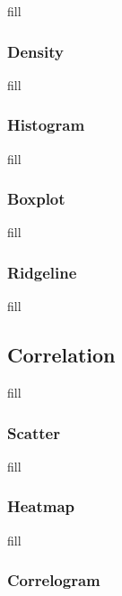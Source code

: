 \documentclass[
  b5paper]{book}
\begin{document}
fill

\hypertarget{density}{%
\subsubsection*{Density}\label{density}}

fill

\hypertarget{histogram}{%
\subsubsection*{Histogram}\label{histogram}}

fill

\hypertarget{boxplot}{%
\subsubsection*{Boxplot}\label{boxplot}}

fill

\hypertarget{ridgeline}{%
\subsubsection*{Ridgeline}\label{ridgeline}}

fill

\hypertarget{correlation}{%
\subsection*{Correlation}\label{correlation}}

fill

\hypertarget{scatter}{%
\subsubsection*{Scatter}\label{scatter}}

fill

\hypertarget{heatmap}{%
\subsubsection*{Heatmap}\label{heatmap}}

fill

\hypertarget{correlogram}{%
\subsubsection*{Correlogram}\label{correlogram}}
\end{document}
